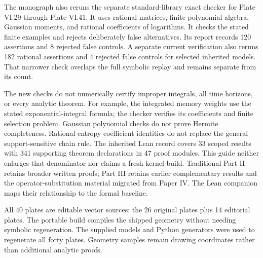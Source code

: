 The monograph also reruns the separate standard-library exact checker for Plate VI.29 through Plate VI.41. It uses rational matrices, finite polynomial algebra, Gaussian moments, and rational coefficients of logarithms. It checks the stated finite examples and rejects deliberately false alternatives. Its report records 120 assertions and 8 rejected false controls. A separate current verification also reruns 182 rational assertions and 4 rejected false controls for selected inherited models. That narrower check overlaps the full symbolic replay and remains separate from its count.

The new checks do not numerically certify improper integrals, all time horizons, or every analytic theorem. For example, the integrated memory weights use the stated exponential-integral formula; the checker verifies its coefficients and finite selection problem. Gaussian polynomial checks do not prove Hermite completeness. Rational entropy coefficient identities do not replace the general support-sensitive chain rule.
The inherited Lean record covers 33 scoped results with 341 supporting theorem declarations in 47 proof modules. This guide neither enlarges that denominator nor claims a fresh kernel build. Traditional Part II retains broader written proofs; Part III retains earlier complementary results and the operator-substitution material migrated from Paper IV. The Lean companion maps their relationship to the formal baseline.

All 40 plates are editable vector sources: the 26 original plates plus 14 editorial plates. The portable build compiles the shipped geometry without needing symbolic regeneration. The supplied models and Python generators were used to regenerate all forty plates. Geometry samples remain drawing coordinates rather than additional analytic proofs.

\endgroup
